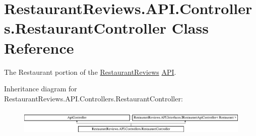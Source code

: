 \hypertarget{class_restaurant_reviews_1_1_a_p_i_1_1_controllers_1_1_restaurant_controller}{}\section{Restaurant\+Reviews.\+A\+P\+I.\+Controllers.\+Restaurant\+Controller Class Reference}
\label{class_restaurant_reviews_1_1_a_p_i_1_1_controllers_1_1_restaurant_controller}


The Restaurant portion of the \hyperlink{namespace_restaurant_reviews}{Restaurant\+Reviews} \hyperlink{namespace_restaurant_reviews_1_1_a_p_i}{A\+PI}.  


Inheritance diagram for Restaurant\+Reviews.\+A\+P\+I.\+Controllers.\+Restaurant\+Controller\+:\begin{figure}[H]
\begin{center}
\leavevmode
\includegraphics[height=1.281464cm]{class_restaurant_reviews_1_1_a_p_i_1_1_controllers_1_1_restaurant_controller}
\end{center}
\end{figure}
